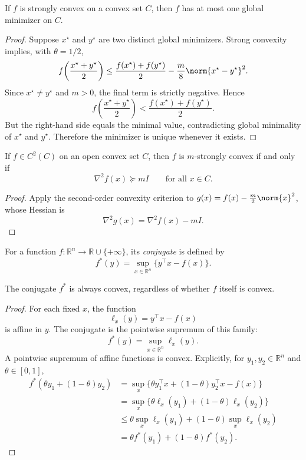 \begin{corollary}\label{cor:l1-uniqueness-of-minimizers}
	If $f$ is strongly convex on a convex set $C$, then $f$ has at most one global minimizer on $C$.
\end{corollary}
\begin{proof}
	Suppose $x^\star$ and $y^\star$ are two distinct global minimizers. Strong convexity implies, with $\theta=1/2$,
	\[
		f\!\left(\frac{x^\star+y^\star}{2}\right)
		\le \frac{f(x^\star)+f(y^\star)}{2} - \frac{m}{8}\norm{x^\star-y^\star}^2.
	\]
	Since $x^\star \neq y^\star$ and $m>0$, the final term is strictly negative. Hence
	\[
		f\!\left(\frac{x^\star+y^\star}{2}\right)
		< \frac{f(x^\star)+f(y^\star)}{2}.
	\]
	But the right-hand side equals the minimal value, contradicting global minimality of $x^\star$ and $y^\star$. Therefore the minimizer is unique whenever it exists.
\end{proof}

\begin{corollary}\label{cor:l1-hessian-test-for-strong-convexity}
	If $f \in C^2(C)$ on an open convex set $C$, then $f$ is $m$-strongly convex if and only if
	\[
		\nabla^2 f(x) \succeq m I
		\qquad \text{for all } x \in C.
	\]
\end{corollary}
\begin{proof}
	Apply the second-order convexity criterion to $g(x)=f(x)-\frac{m}{2}\norm{x}^2$, whose Hessian is
	\[
		\nabla^2 g(x)=\nabla^2 f(x)-mI.
	\]
\end{proof}

\begin{definition}\label{def:l1-legendre-fenchel-conjugate}
	For a function $f:\mathbb{R}^n \to \mathbb{R} \cup \{+\infty\}$, its \emph{conjugate} is defined by
	\[
		f^\ast(y)=\sup_{x \in \mathbb{R}^n}\bigl\{y^\top x - f(x)\bigr\}.
	\]
\end{definition}

\begin{proposition}\label{prop:l1-convexity-of-the-conjugate}
	The conjugate $f^\ast$ is always convex, regardless of whether $f$ itself is convex.
\end{proposition}
\begin{proof}
	For each fixed $x$, the function
	\[
		\ell_x(y)=y^\top x-f(x)
	\]
	is affine in $y$. The conjugate is the pointwise supremum of this family:
	\[
		f^\ast(y)=\sup_{x \in \mathbb{R}^n}\ell_x(y).
	\]
	A pointwise supremum of affine functions is convex. Explicitly, for $y_1,y_2 \in \mathbb{R}^n$ and $\theta \in [0,1]$,
	\begin{align*}
		f^\ast(\theta y_1+(1-\theta)y_2)
		 & = \sup_x \{\theta y_1^\top x + (1-\theta)y_2^\top x - f(x)\} \\
		 & = \sup_x \{\theta \ell_x(y_1)+(1-\theta)\ell_x(y_2)\} \\
		 & \le \theta \sup_x \ell_x(y_1) + (1-\theta)\sup_x \ell_x(y_2) \\
		 & = \theta f^\ast(y_1)+(1-\theta)f^\ast(y_2).
	\end{align*}
\end{proof}

